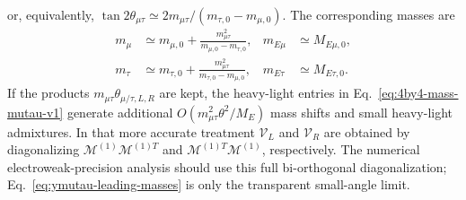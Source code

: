 \documentclass[onecolumn, aps, nofootinbib, prd, preprint, floats, floatfix, amsmath, amssymb, superscriptaddress, preprintnumbers]{revtex4-1}
\begin{document}
or, equivalently, \(\tan2\theta_{\mu\tau}\simeq2m_{\mu\tau}/(m_{\tau,0}-m_{\mu,0})\). The corresponding masses are
\begin{equation}
\begin{aligned}
m_\mu &\simeq m_{\mu,0}+\frac{m_{\mu\tau}^2}{m_{\mu,0}-m_{\tau,0}},&
m_{E\mu} &\simeq M_{E\mu,0},\\
m_\tau &\simeq m_{\tau,0}+\frac{m_{\mu\tau}^2}{m_{\tau,0}-m_{\mu,0}},&
m_{E\tau} &\simeq M_{E\tau,0}.
\end{aligned}
\label{eq:ymutau-leading-masses}
\end{equation}
If the products \(m_{\mu\tau}\theta_{\mu/\tau,L,R}\) are kept, the heavy-light entries in Eq.~\eqref{eq:4by4-mass-mutau-v1} generate additional \(O(m_{\mu\tau}^2\theta^2/M_E)\) mass shifts and small heavy-light admixtures. In that more accurate treatment \(\mathcal{V}_L\) and \(\mathcal{V}_R\) are obtained by diagonalizing \(\mathcal{M}^{(1)}\mathcal{M}^{(1)T}\) and \(\mathcal{M}^{(1)T}\mathcal{M}^{(1)}\), respectively. The numerical electroweak-precision analysis should use this full bi-orthogonal diagonalization; Eq.~\eqref{eq:ymutau-leading-masses} is only the transparent small-angle limit.
\end{document}
